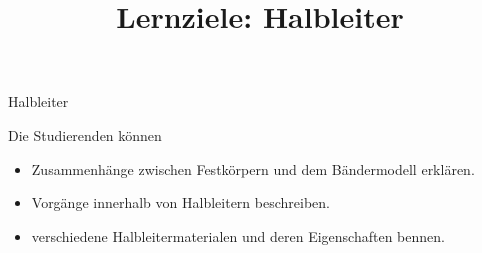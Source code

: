 {%
%
%


\begin{Lernziele}{Halbleiter}
    \title{Lernziele: Halbleiter}
    Die Studierenden können
    \begin{itemize}
        \item Zusammenhänge zwischen Festkörpern und dem Bändermodell erklären.
        \item Vorgänge innerhalb von Halbleitern beschreiben.
        \item verschiedene Halbleitermaterialen und deren Eigenschaften bennen.
    \end{itemize}
    \end{Lernziele}
}


